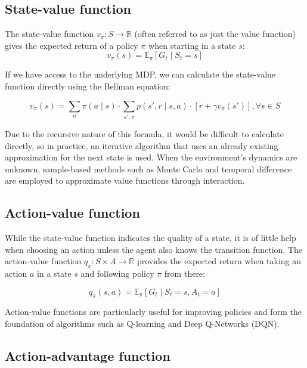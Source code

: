 \documentclass[
  digital,     %
  oneside,     %
  nosansbold,  %
  nocolorbold, %
  lof,         %
  lot,         %
]{fithesis4}
\begin{document}
\subsection{State-value function}
\label{subsec:state_value_func}
The state-value function $v_\pi\colon S\to \mathbb{R}$ (often referred to as just the value function) gives the expected return of a policy $\pi$ when starting in a state $s$:
\begin{equation}
v_\pi(s) = \mathbb{E}_\pi [G_t\mid S_t=s]
\end{equation}

If we have access to the underlying MDP, we can calculate the state-value function directly using the Bellman equation:

\begin{equation}
v_\pi(s) = \sum_a \pi(a\mid s) \cdot \sum_{s',\,r} p(s',r\mid s,a)\cdot[r+\gamma v_\pi(s')], \forall s \in S
\end{equation}

Due to the recursive nature of this formula, it would be difficult to calculate directly, so in practice, an iterative algorithm that uses an already existing approximation for the next state is used. When the environment's dynamics are unknown, sample-based methods such as Monte Carlo and temporal difference are employed to approximate value functions through interaction.

\subsection{Action-value function}

While the state-value function indicates the quality of a state, it is of little help when choosing an action unless the agent also knows the transition function. The action-value function $q_\pi\colon S \times A \to \mathbb{R}$ provides the expected return when taking an action $a$ in a state $s$ and following policy $\pi$ from there:

\begin{equation}
q_\pi(s,a) = \mathbb{E}_\pi [G_t\mid S_t=s,A_t=a]
\end{equation}

Action-value functions are particularly useful for improving policies and form the foundation of algorithms such as Q-learning and Deep Q-Networks (DQN).

\subsection{Action-advantage function}
\end{document}
